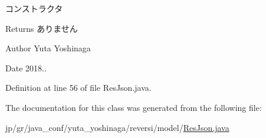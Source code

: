 コンストラクタ 

\begin{DoxyReturn}{Returns}
ありません 
\end{DoxyReturn}
\begin{DoxyAuthor}{Author}
Yuta Yoshinaga 
\end{DoxyAuthor}
\begin{DoxyDate}{Date}
2018.. 
\end{DoxyDate}


Definition at line 56 of file Res\+Json.\+java.



The documentation for this class was generated from the following file\+:\begin{DoxyCompactItemize}
\item 
jp/gr/java\+\_\+conf/yuta\+\_\+yoshinaga/reversi/model/\mbox{\hyperlink{_res_json_8java}{Res\+Json.\+java}}\end{DoxyCompactItemize}
